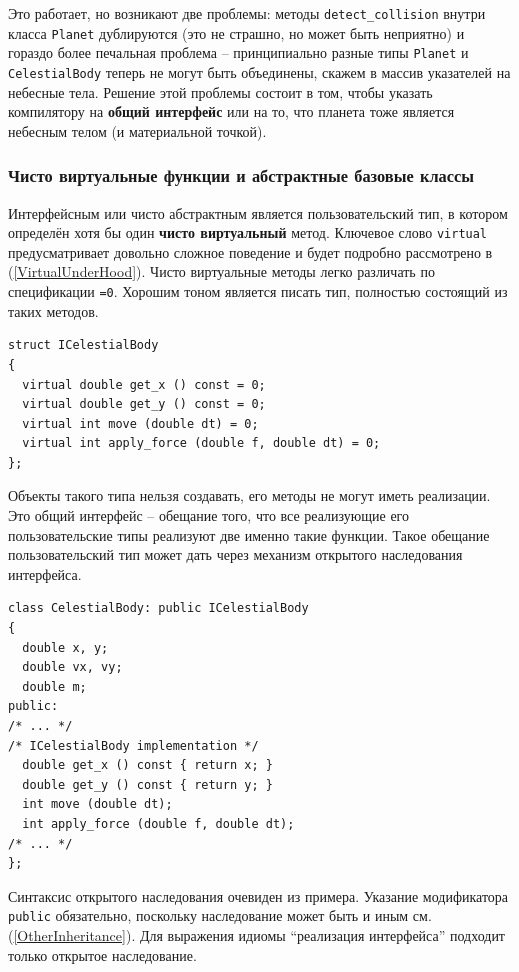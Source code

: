 \documentclass[a4paper,12pt,oneside]{article}
\begin{document}
Это работает, но возникают две проблемы: методы \lstinline!detect_collision! внутри класса \lstinline!Planet! дублируются (это не страшно, но может быть неприятно) и гораздо более печальная проблема -- принципиально разные типы \lstinline!Planet! и \lstinline!CelestialBody! теперь не могут быть объединены, скажем в массив указателей на небесные тела. Решение этой проблемы состоит в том, чтобы указать компилятору на \textbf{общий интерфейс} или на то, что планета тоже является небесным телом (и материальной точкой).

\subsubsection{Чисто виртуальные функции и абстрактные базовые классы}\label{PureVirtual}

Интерфейсным или чисто абстрактным является пользовательский тип, в котором определён хотя бы один \textbf{чисто виртуальный} метод. Ключевое слово \lstinline!virtual! предусматривает довольно сложное поведение и будет подробно рассмотрено в (\ref{VirtualUnderHood}). Чисто виртуальные методы легко различать по спецификации \lstinline!=0!. Хорошим тоном является писать тип, полностью состоящий из таких методов.

\begin{lstlisting}
struct ICelestialBody
{
  virtual double get_x () const = 0;
  virtual double get_y () const = 0;
  virtual int move (double dt) = 0;
  virtual int apply_force (double f, double dt) = 0;
};
\end{lstlisting}

Объекты такого типа нельзя создавать, его методы не могут иметь реализации. Это общий интерфейс -- обещание того, что все реализующие его пользовательские типы реализуют две именно такие функции. Такое обещание пользовательский тип может дать через механизм открытого наследования интерфейса.

\begin{lstlisting}
class CelestialBody: public ICelestialBody
{
  double x, y;
  double vx, vy;
  double m;
public:
/* ... */
/* ICelestialBody implementation */
  double get_x () const { return x; }
  double get_y () const { return y; }
  int move (double dt); 
  int apply_force (double f, double dt);
/* ... */
};
\end{lstlisting}

Синтаксис открытого наследования очевиден из примера. Указание модификатора \lstinline!public! обязательно, поскольку наследование может быть и иным см. (\ref{OtherInheritance}). Для выражения идиомы ``реализация интерфейса'' подходит только открытое наследование. 
\end{document}
